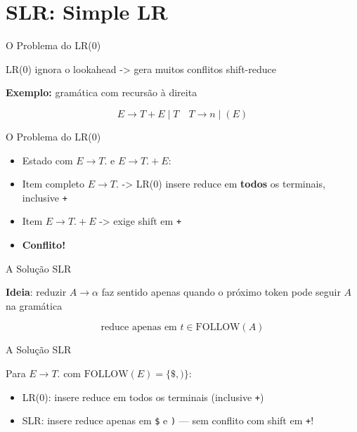 \section{SLR: Simple LR}\label{slr-simple-lr}

\begin{frame}{O Problema do LR(0)}

    LR(0) ignora o lookahead -> gera muitos conflitos shift-reduce

    \textbf{Exemplo:} gramática com recursão à direita

    \[E \to T + E \mid T \quad T \to n \mid (E)\]
\end{frame}

\begin{frame}[fragile]{O Problema do LR(0)}

    \begin{itemize}
        \item
        Estado com \(E \to T .\) e \(E \to T . + E\):
        \item
        Item completo \(E \to T .\) -> LR(0) insere reduce em \textbf{todos} os
        terminais, inclusive \texttt{+}
        \item
        Item \(E \to T . + E\) -> exige shift em \texttt{+}
        \item
        \textbf{Conflito!}
    \end{itemize}
\end{frame}

\begin{frame}{A Solução SLR}

    \textbf{Ideia}: reduzir \(A \to \alpha\) faz sentido apenas quando o
    próximo token pode seguir \(A\) na gramática

    \[\text{reduce apenas em } t \in \mathrm{FOLLOW}(A)\]
\end{frame}

\begin{frame}[fragile]{A Solução SLR}

    Para \(E \to T .\) com \(\mathrm{FOLLOW}(E) = \{\$, )\}\):

    \begin{itemize}

        \item
        LR(0): insere reduce em todos os terminais (inclusive
        \texttt{+})
        \item
        SLR: insere reduce apenas em \verb|$| e
        \texttt{)} --- sem conflito com shift em
        \texttt{+}!
    \end{itemize}
\end{frame}

